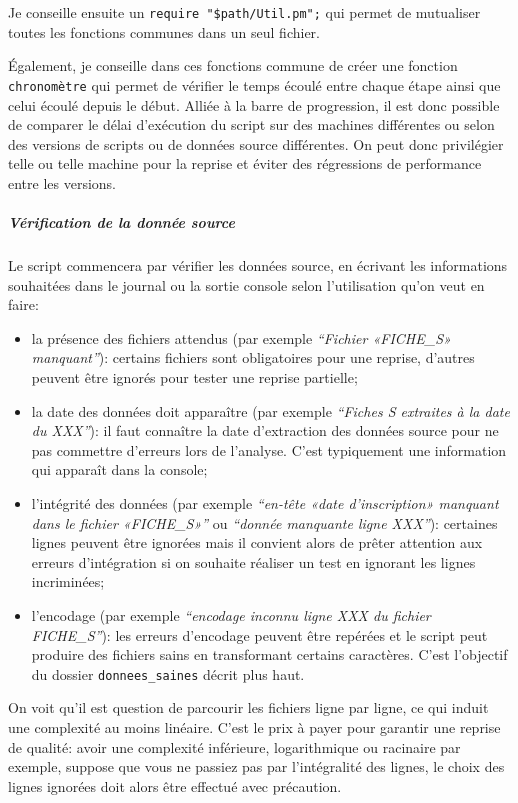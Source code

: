 \documentclass{book}
\begin{document}
Je conseille ensuite un \texttt{require "\$path/Util.pm";} qui permet de mutualiser toutes les fonctions communes dans un seul fichier.

Également, je conseille dans ces fonctions commune de créer une fonction \texttt{chronomètre} qui permet de vérifier le temps écoulé entre chaque étape ainsi que celui écoulé depuis le début. Alliée à la barre de progression, il est donc possible de comparer le délai d'exécution du script sur des machines différentes ou selon des versions de scripts ou de données source différentes. On peut donc privilégier telle ou telle machine pour la reprise et éviter des régressions de performance entre les versions.
	
\subparagraph{Vérification de la donnée source}

Le script commencera par vérifier les données source, en écrivant les informations souhaitées dans le journal ou la sortie console selon l'utilisation qu'on veut en faire:
\begin{itemize}
 \item la présence des fichiers attendus (par exemple \textit{``Fichier «FICHE\_S» manquant''}): certains fichiers sont obligatoires pour une reprise, d'autres peuvent être ignorés pour tester une reprise partielle;
 \item la date des données doit apparaître (par exemple \textit{``Fiches S extraites à la date du XXX''}): il faut connaître la date d'extraction des données source pour ne pas commettre d'erreurs lors de l'analyse. C'est typiquement une information qui apparaît dans la console;
 \item l'intégrité des données (par exemple \textit{``en-tête «date d'inscription» manquant dans le fichier «FICHE\_S»''} ou \textit{``donnée manquante ligne XXX''}): certaines lignes peuvent être ignorées mais il convient alors de prêter attention aux erreurs d'intégration si on souhaite réaliser un test en ignorant les lignes incriminées;
 \item l'encodage (par exemple \textit{``encodage inconnu ligne XXX du fichier FICHE\_S''}): les erreurs d'encodage peuvent être repérées et le script peut produire des fichiers sains en transformant certains caractères. C'est l'objectif du dossier \texttt{donnees\_saines} décrit plus haut.
\end{itemize}

On voit qu'il est question de parcourir les fichiers ligne par ligne, ce qui induit une complexité au moins linéaire. C'est le prix à payer pour garantir une reprise de qualité: avoir une complexité inférieure, logarithmique ou racinaire par exemple, suppose que vous ne passiez pas par l'intégralité des lignes, le choix des lignes ignorées doit alors être effectué avec précaution.
\end{document}
